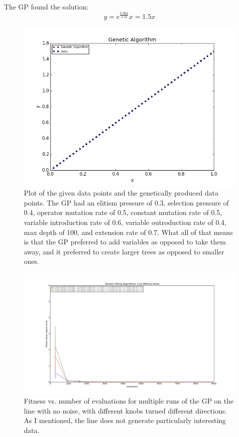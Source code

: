 \documentclass[11pt,amsmath,amssymb]{revtex4}
\begin{document}
The GP found the solution:
\begin{equation}
y = e^{\frac{0.904}{2.23}}x = 1.5x
\end{equation}

\begin{figure}[H]
\center
\includegraphics[scale=0.55]{Line_No_Noise.png}
\caption{Plot of the given data points and the genetically produced data points. The GP had an elitism pressure of 0.3, selection pressure of 0.4, operator mutation rate of 0.5, constant mutation rate of 0.5, variable introduction rate of 0.6, variable outroduction rate of 0.4, max depth of 100, and extension rate of 0.7. What all of that means is that the GP preferred to add variables as opposed to take them away, and it preferred to create larger trees as opposed to smaller ones.}
\label{q1}
\end{figure}

\begin{figure}[H]
\center
\includegraphics[scale=0.35]{Line_No_Noise_Comparison.png}
\caption{Fitness vs. number of evaluations for multiple runs of the GP on the line with no noise, with different knobs turned different directions. As I mentioned, the line does not generate particularly interesting data.}
\label{q1}
\end{figure}
\end{document}
